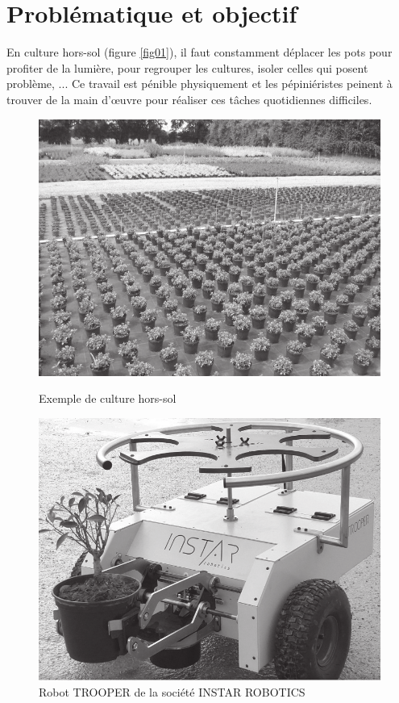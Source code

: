 

\section{Problématique et objectif}

En culture hors-sol (figure \ref{fig01}), il faut constamment déplacer les pots pour profiter de la lumière, pour regrouper les cultures, isoler celles qui posent problème, ... Ce travail est pénible physiquement et les pépiniéristes peinent à trouver de la main d'\oe uvre pour réaliser ces tâches quotidiennes difficiles.

\begin{figure}[ht!]
\begin{minipage}{0.46\linewidth}
\begin{center}
 \includegraphics[width=0.8\linewidth]{img/fig01}
\end{center}
\caption{Exemple de culture hors-sol}
\label{fig01}
\end{minipage}
\hfill
\begin{minipage}{0.46\linewidth}
\begin{center}
 \includegraphics[width=0.8\linewidth]{img/fig02}
\end{center}
\caption{Robot TROOPER de la société INSTAR ROBOTICS}
\label{fig02}
\end{minipage}
\end{figure}

